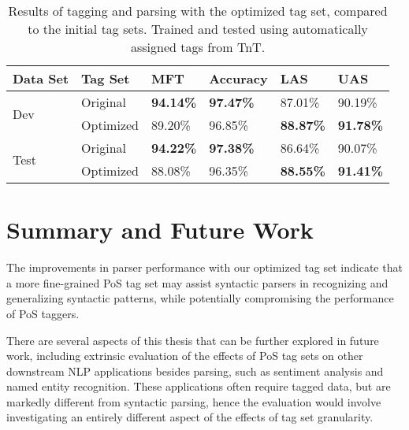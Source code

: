 \documentclass[11pt,a4paper]{article}
\begin{document}
\begin{table}
    \centering
    \smaller[0.5]
    \begin{tabular}{@{}llllll@{}}
        \toprule
        \textbf{Data Set} & \textbf{Tag Set} & \textbf{MFT} & \textbf{Accuracy}
        & \textbf{LAS} & \textbf{UAS} \\
        \midrule
        \multirow{2}{*}{Dev}
        & Original & \textbf{94.14\%} & \textbf{97.47\%} & 87.01\% & 90.19\% \\
        & Optimized & 89.20\% & 96.85\% & \textbf{88.87\%} & \textbf{91.78\%} \\
        \midrule
        \multirow{2}{*}{Test}
        & Original & \textbf{94.22\%} & \textbf{97.38\%} & 86.64\% & 90.07\% \\
        & Optimized & 88.08\% & 96.35\% & \textbf{88.55\%} & \textbf{91.41\%} \\
        \bottomrule
    \end{tabular}
    \caption{Results of tagging and parsing with the optimized tag set,
        compared to the initial tag sets. Trained and tested using
        automatically assigned tags from TnT.}
    \label{finalresults}
\end{table}


\section{Summary and Future Work}
\label{sec:summary}
The improvements in parser performance with our optimized tag set indicate that
a more fine-grained PoS tag set may assist syntactic parsers in recognizing and
generalizing syntactic patterns, while potentially compromising the performance
of PoS taggers.

There are several aspects of this thesis that can be further explored in future
work, including extrinsic evaluation of the effects of PoS tag sets on other
downstream NLP applications besides parsing, such as sentiment analysis and
named entity recognition. These applications often require tagged data, but are
markedly different from syntactic parsing, hence the evaluation would involve
investigating an entirely different aspect of the effects of tag set
granularity.




\end{document}
